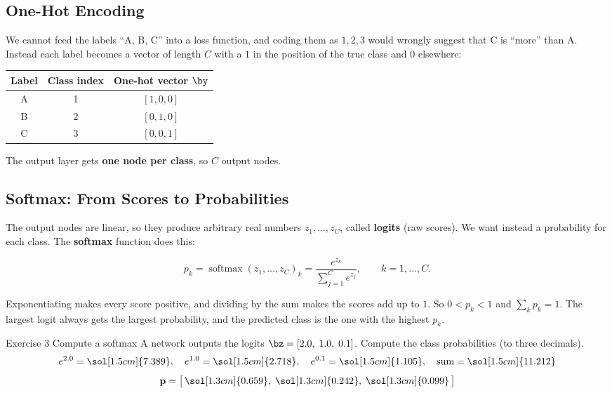 \documentclass[12pt, a4paper]{article}
\providecommand{\bp}{\mathbf{p}}
\begin{document}
\subsection{One-Hot Encoding}

We cannot feed the labels ``A, B, C'' into a loss function, and coding them as
$1, 2, 3$ would wrongly suggest that C is ``more'' than A. Instead each label
becomes a vector of length $C$ with a $1$ in the position of the true class
and $0$ elsewhere:

\begin{center}
  \renewcommand{\arraystretch}{1.25}
  \begin{tabular}{ccc}
    \toprule
    Label & Class index & One-hot vector $\by$ \\
    \midrule
    A     & 1           & $[1, 0, 0]$          \\
    B     & 2           & $[0, 1, 0]$          \\
    C     & 3           & $[0, 0, 1]$          \\
    \bottomrule
  \end{tabular}
\end{center}

The output layer gets \textbf{one node per class}, so $C$ output nodes.

\subsection{Softmax: From Scores to Probabilities}

The output nodes are linear, so they produce arbitrary real numbers
$z_1, \dots, z_C$, called \textbf{logits} (raw scores). We want instead a
probability for each class. The \textbf{softmax} function does this:
\begin{resultbox}
  \[
    p_k = \operatorname{softmax}(z_1, \dots, z_C)_k
    = \frac{e^{z_k}}{\sum_{j=1}^{C} e^{z_j}},
    \qquad k = 1, \dots, C.
  \]
\end{resultbox}
Exponentiating makes every score positive, and dividing by the sum makes the
scores add up to $1$. So $0 < p_k < 1$ and $\sum_k p_k = 1$. The largest
logit always gets the largest probability, and the predicted class is the one
with the highest $p_k$.

\begin{stepbox}{Exercise 3 \quad Compute a softmax}
  A network outputs the logits $\bz = [2.0,\; 1.0,\; 0.1]$. Compute the class
  probabilities (to three decimals).
  \[
    e^{2.0} = \sol[1.5cm]{7.389}, \quad
    e^{1.0} = \sol[1.5cm]{2.718}, \quad
    e^{0.1} = \sol[1.5cm]{1.105}, \quad
    \text{sum} = \sol[1.5cm]{11.212}
  \]
  \[
    \bp = \bigl[\,\sol[1.3cm]{0.659},\; \sol[1.3cm]{0.242},\;
      \sol[1.3cm]{0.099}\,\bigr]
  \]
\end{stepbox}
\end{document}
